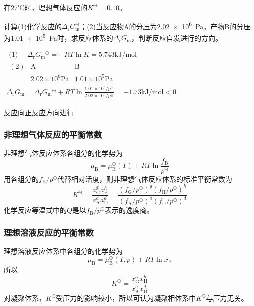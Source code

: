 \begin{frame}[t]
    \frametitle{}

    \begin{example}
        在27℃时，理想气体反应的$K^{\ominus}=0.10$。
        
        计算(1)化学反应的$\Delta_{\mathrm{r}} G_{\mathrm{m}}^{\ominus}$；(2)当反应物A的分压为\SI{2.02e6}{Pa}，产物B的分压为\SI{1.01e5}{Pa}时，求反应体系的$\Delta_{\mathrm{r}} G_{\mathrm{m}}$，判断反应自发进行的方向。
    \end{example}
    \pause
    $\begin{array}{l}
        \text { (1) } \quad \Delta_{\mathrm{r}} G_{\mathrm{m}}{ }^{\ominus}=-R T \ln K=5.743 \mathrm{kJ} / \mathrm{mol}\\
        \begin{array}{cccc} 
        (2) & \mathrm{A} & \mathrm{B} \\
        & 2.02 \times 10^{6} \mathrm{Pa} & 1.01 \times 10^{5} \mathrm{Pa}
        \end{array}\\
        \Delta_{\mathrm{r}} G_{\mathrm{m}}=\Delta_{\mathrm{r}} G_{\mathrm{m}}{ }^{\ominus}+R T \ln \frac{1.01 \times 10^{5}/p^\ominus}{2.02 \times 10^{6}/p^\ominus}=-1.73 \mathrm{kJ} / \mathrm{mol}<0
        \end{array}$

        反应向正反应方向进行

\end{frame}


\begin{frame}
    \frametitle{非理想气体反应的平衡常数}

    \large 非理想气体反应体系各组分的化学势为
    \[
        \mu_{\mathrm{B}}=\mu_{\mathrm{B}}^{\ominus}(T)+R T \ln \frac{f_{\mathrm{B}}}{p^{\ominus}}
    \]
    用各组分的$f_\mathrm{B}/p^\ominus$代替相对活度，则非理想气体反应体系的标准平衡常数为
    \[
        K^{\ominus}=\frac{a_{\mathrm{G}}^{\mathrm{g}} a_{\mathrm{H}}^{h}}{a_{\mathrm{A}}^{a} a_{\mathrm{D}}^{d}}=\frac{(f_{\mathrm{G}} / p^{\ominus})^{g}(f_{\mathrm{H}} / p^{\ominus})^{h}}{(f_{\mathrm{A}} / p^{\ominus})^{a}(f_{\mathrm{D}} / p^{\ominus})^{d}}
    \]
    化学反应等温式中的$Q$是以$f_\mathrm{B}/p^\ominus$表示的逸度商。

\end{frame}


\begin{frame}
    \frametitle{理想溶液反应的平衡常数}

    \large 理想溶液反应体系中各组分的化学势为
    \[
        \mu_{\mathrm{B}}=\mu_{\mathrm{B}}^{\ominus}(T,p)+R T \ln {x_{\mathrm{B}}}
    \]
    所以
    \[
        K^{\ominus}=\frac{x_{\mathrm{G}}^{\mathrm{g}} x_{\mathrm{H}}^{h}}{x_{\mathrm{A}}^{a} x_{\mathrm{D}}^{d}}
    \]
    对凝聚体系，$K^{\ominus}$受压力的影响较小，所以可认为凝聚相体系中$K^{\ominus}$与压力无关。

\end{frame}


